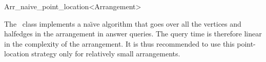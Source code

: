 
\ccRefPageBegin

\begin{ccRefClass}{Arr_naive_point_location<Arrangement>}
\label{arr_ref:naive_pl}

\ccDefinition

The \ccRefName\ class implements a na\"{\i}ve algorithm that goes over
all the vertices and halfedges in the arrangement in answer queries.
The query time is therefore linear in the complexity of the arrangement.
It is thus recommended to use this point-location strategy only for relatively
small arrangements.


\ccIsModel
   \\

\end{ccRefClass}

\ccRefPageEnd
